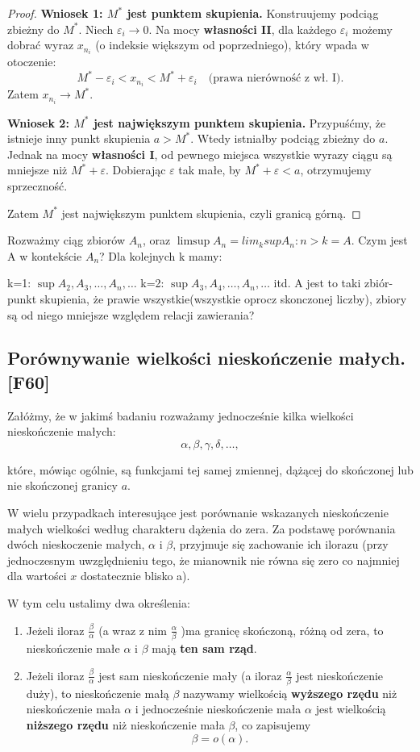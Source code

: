 \begin{proof}
    \noindent \textbf{Wniosek 1: $M^*$ jest punktem skupienia.}
    Konstruujemy podciąg zbieżny do $M^*$. Niech $\varepsilon_i \to 0$.
    Na mocy \textbf{własności II}, dla każdego $\varepsilon_i$ możemy dobrać wyraz $x_{n_i}$ (o indeksie większym od poprzedniego), który wpada w otoczenie:
    \[ M^* - \varepsilon_i < x_{n_i} < M^* + \varepsilon_i \quad \text{(prawa nierówność z wł. I)}. \]
    Zatem $x_{n_i} \to M^*$.

    \noindent \textbf{Wniosek 2: $M^*$ jest największym punktem skupienia.}
    Przypuśćmy, że istnieje inny punkt skupienia $a > M^*$. Wtedy istniałby podciąg zbieżny do $a$. Jednak na mocy \textbf{własności I}, od pewnego miejsca wszystkie wyrazy ciągu są mniejsze niż $M^* + \varepsilon$. Dobierając $\varepsilon$ tak małe, by $M^* + \varepsilon < a$, otrzymujemy sprzeczność.
    
    Zatem $M^*$ jest największym punktem skupienia, czyli granicą górną.
\end{proof}



Rozważmy ciąg zbiorów $A_{n}$, oraz $\limsup A_{n} = lim_k sup{A_{n}: n>k} = A$. Czym jest A w kontekście $A_{n}$? Dla kolejnych k mamy:

k=1: $\sup{A_2,A_3,\ldots,A_{n},\ldots}$
k=2: $\sup{A_3,A_4,\ldots,A_{n},\ldots}$
itd.
A jest to taki zbiór- punkt skupienia, że prawie wszystkie(wszystkie oprocz skonczonej liczby), zbiory są od niego mniejsze względem relacji zawierania?
\subsection{Porównywanie wielkości nieskończenie małych.[F60]}
Załóżmy, że w jakimś badaniu rozważamy jednocześnie kilka wielkości nieskończenie małych:
\[
	\alpha, \beta, \gamma, \delta,\ldots
,\] 

które, mówiąc ogólnie, są funkcjami tej samej zmiennej, dążącej do skończonej lub nie skończonej granicy $a$.

W wielu przypadkach interesujące jest porównanie wskazanych nieskończenie małych wielkości według charakteru dążenia do zera. Za podstawę porównania dwóch nieskoczenie małych,  $\alpha$ i $\beta$, przyjmuje się zachowanie ich ilorazu (przy jednoczesnym uwzględnieniu tego, że mianownik nie równa się zero co najmniej dla wartości $x$ dostatecznie blisko a).

W tym celu ustalimy dwa określenia:
\begin{enumerate}[label=\arabic*.]
	\item Jeżeli iloraz $\frac{\beta}{\alpha}$ (a wraz z nim $\frac{\alpha}{\beta}$ )ma granicę skończoną, różną od zera, to nieskończenie małe $\alpha$ i $\beta$ mają \textbf{ten sam rząd}.
	\item Jeżeli iloraz $\frac{\beta}{\alpha}$ jest sam nieskończenie mały (a iloraz $\frac{\alpha}{\beta}$ jest nieskończenie duży), to nieskończenie małą $\beta$ nazywamy wielkością \textbf{wyższego rzędu} niż nieskończenie mała $\alpha$ i jednocześnie nieskończenie mała $\alpha$ jest wielkością \textbf{niższego rzędu} niż nieskończenie mała $\beta$, co zapisujemy \[
	\beta = o\left( \alpha \right) 
	.\]  
\end{enumerate}

